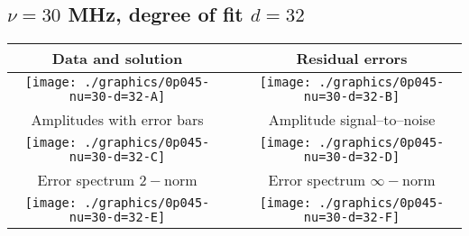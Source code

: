 

% 

\clearpage{}
\break{}

\subsection{$\nu = 30$ MHz, degree of fit $d = 32$}

\begin{table}[h]
    \begin{center}
        \begin{tabular}{ccc}
            Data and solution & \quad & Residual errors \\\hline
            \texttt{[image: ./graphics/0p045-nu=30-d=32-A]} &&
            \texttt{[image: ./graphics/0p045-nu=30-d=32-B]} \\[15pt]
            Amplitudes with error bars && Amplitude signal--to--noise \\\hline
            \texttt{[image: ./graphics/0p045-nu=30-d=32-C]} &&
            \texttt{[image: ./graphics/0p045-nu=30-d=32-D]} \\[15pt]
            Error spectrum $2-$norm && Error spectrum $\infty-$norm \\\hline
            \texttt{[image: ./graphics/0p045-nu=30-d=32-E]} &&
            \texttt{[image: ./graphics/0p045-nu=30-d=32-F]} \\[15pt]
        \end{tabular}
    \end{center}
\label{fig:elev=45, nu=30}
\end{table}



\endinput
